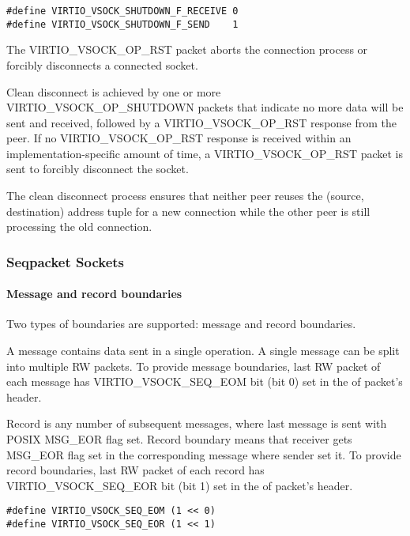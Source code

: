 \begin{lstlisting}
#define VIRTIO_VSOCK_SHUTDOWN_F_RECEIVE 0
#define VIRTIO_VSOCK_SHUTDOWN_F_SEND    1
\end{lstlisting}

The VIRTIO_VSOCK_OP_RST packet aborts the connection process or forcibly
disconnects a connected socket.

Clean disconnect is achieved by one or more VIRTIO_VSOCK_OP_SHUTDOWN packets
that indicate no more data will be sent and received, followed by a
VIRTIO_VSOCK_OP_RST response from the peer.  If no VIRTIO_VSOCK_OP_RST response
is received within an implementation-specific amount of time, a
VIRTIO_VSOCK_OP_RST packet is sent to forcibly disconnect the socket.

The clean disconnect process ensures that neither peer reuses the (source,
destination) address tuple for a new connection while the other peer is still
processing the old connection.

\subsubsection{Seqpacket Sockets}\label{sec:Device Types / Socket Device / Device Operation / Seqpacket Sockets}

\paragraph{Message and record boundaries}\label{sec:Device Types / Socket Device / Device Operation / Seqpacket Sockets / Boundaries}
Two types of boundaries are supported: message and record boundaries.

A message contains data sent in a single operation. A single message can be
split into multiple RW packets.
To provide message boundaries, last RW packet of each message has
VIRTIO_VSOCK_SEQ_EOM bit (bit 0) set in the  of packet's header.

Record is any number of subsequent messages, where last message is sent with POSIX
MSG_EOR flag set. Record boundary means that receiver gets MSG_EOR flag set
in the corresponding message where sender set it.
To provide record boundaries, last RW packet of each record has VIRTIO_VSOCK_SEQ_EOR
bit (bit 1) set in the  of packet's header.

\begin{lstlisting}
#define VIRTIO_VSOCK_SEQ_EOM (1 << 0)
#define VIRTIO_VSOCK_SEQ_EOR (1 << 1)
\end{lstlisting}

